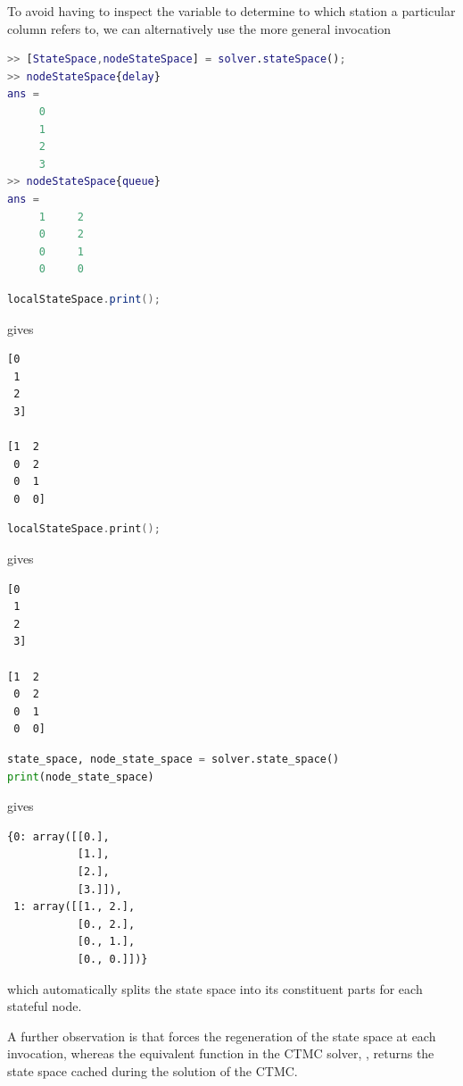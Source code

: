 To avoid having to inspect the  variable to determine to which station a particular column refers to, we can alternatively use the more general invocation
\begin{MATLAB}
\begin{lstlisting}[language = matlab]
>> [StateSpace,nodeStateSpace] = solver.stateSpace();
>> nodeStateSpace{delay}
ans =
     0
     1
     2
     3
>> nodeStateSpace{queue}
ans =
     1     2
     0     2
     0     1
     0     0
\end{lstlisting}
\end{MATLAB}
\begin{JAVA}
\begin{lstlisting}[language=java, basicstyle=\ttfamily\scriptsize]
localStateSpace.print();
\end{lstlisting}
gives
\begin{lstlisting}[basicstyle=\ttfamily\scriptsize]
[0 
 1 
 2 
 3]

[1  2 
 0  2 
 0  1 
 0  0]
\end{lstlisting}
\end{JAVA}
\begin{KOTLIN}
\begin{lstlisting}[language=kotlin, basicstyle=\ttfamily\scriptsize]
localStateSpace.print();
\end{lstlisting}
gives
\begin{lstlisting}[basicstyle=\ttfamily\scriptsize]
[0 
 1 
 2 
 3]

[1  2 
 0  2 
 0  1 
 0  0]
\end{lstlisting}
\end{KOTLIN}
\begin{PYTHON}
\begin{lstlisting}[language=python]
state_space, node_state_space = solver.state_space()
print(node_state_space)
\end{lstlisting}
gives
\begin{lstlisting}[basicstyle=\ttfamily\scriptsize]
{0: array([[0.],
           [1.],
           [2.],
           [3.]]), 
 1: array([[1., 2.],
           [0., 2.],
           [0., 1.],
           [0., 0.]])}
\end{lstlisting}
\end{PYTHON}
which automatically splits the state space into its constituent parts for each stateful node.

A further observation is that  forces the regeneration of the state space at each invocation, whereas the equivalent function in the CTMC solver, , returns the state space cached during the solution of the CTMC.

